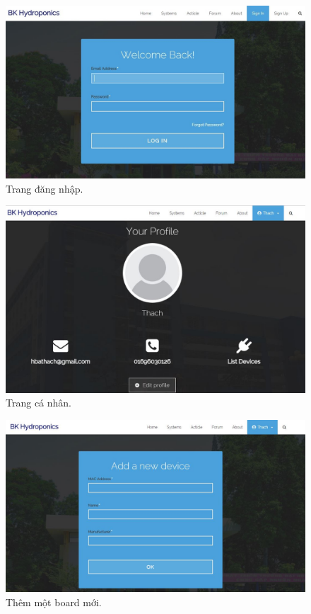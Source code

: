 \documentclass[a4paper,12pt,oneside]{article}
\begin{document}
\begin{center}
\begin{figure}[H]
\begin{center}
\includegraphics[scale=.5]{hinh/web_login.jpg}
\end{center}
\caption{Trang đăng nhập.}
\end{figure}

\begin{figure}[H]
\begin{center}
\includegraphics[scale=.5]{hinh/web_profile.jpg}
\end{center}
\caption{Trang cá nhân.}
\end{figure}

\begin{figure}[H]
\begin{center}
\includegraphics[scale=.5]{hinh/web_add_device.jpg}
\end{center}
\caption{Thêm một board mới.}
\end{figure}


\end{center}
\end{document}
